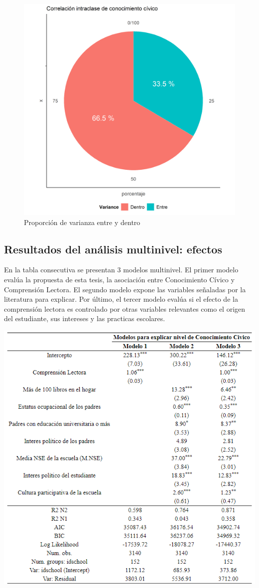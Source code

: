 \documentclass[12pt,twoside]{templates/facsothesis}
\begin{document}
\begin{figure}

{\centering \includegraphics[width=0.5\linewidth]{images/iccplot} 

}

\caption{Proporción de varianza entre y dentro}\label{fig:unnamed-chunk-12}
\end{figure}

\newpage

\hypertarget{resultados-del-anuxe1lisis-multinivel-efectos}{%
\subsection{Resultados del análisis multinivel: efectos}\label{resultados-del-anuxe1lisis-multinivel-efectos}}

En la tabla consecutiva se presentan 3 modelos multinivel. El primer modelo evalúa la propuesta de esta tesis, la asociación entre Conocimiento Cívico y Comprensión Lectora. El segundo modelo expone las variables señaladas por la literatura para explicar. Por último, el tercer modelo evalúa si el efecto de la comprensión lectora es controlado por otras variables relevantes como el origen del estudiante, sus intereses y las practicas escolares.

\begin{center}\includegraphics[width=0.8\linewidth]{images/regmultinivel} \end{center}
\end{document}
